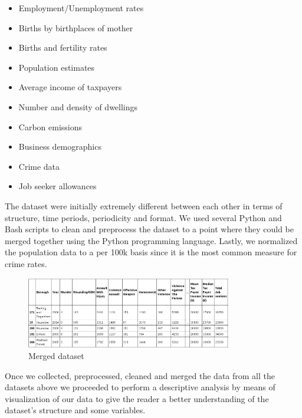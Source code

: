\documentclass[12pt, openany]{report}
\begin{document}
\begin{itemize}

\item Employment/Unemployment rates
\item Births by birthplaces of mother
\item Births and fertility rates
\item Population estimates
\item Average income of taxpayers
\item Number and density of dwellings
\item Carbon emissions
\item Business demographics
\item Crime data
\item Job seeker allowances

\end{itemize}

The dataset were initially extremely different between each other in terms of structure, time periods, periodicity and format. We used several Python and Bash scripts to clean and preprocess the dataset to a point where they could be merged together using the Python programming language. Lastly, we normalized the population data to a per 100k basis since it is the most common measure for crime rates.

\begin{figure}[h!]
\centering
        \includegraphics[width=0.8\textwidth]{images/merged_dataset.png}
        \caption{Merged dataset}
\end{figure}

Once we collected, preprocessed, cleaned and merged the data from all the datasets above we proceeded to perform a descriptive analysis by means of visualization of our data to give the reader a better understanding of the dataset’s structure and some variables.
\end{document}
